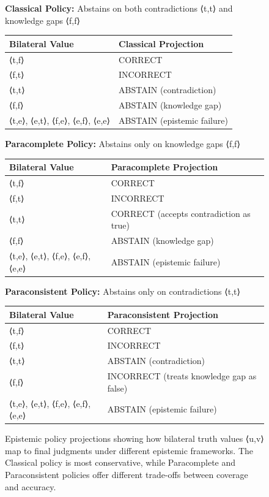 \documentclass[11pt]{article}
\begin{document}
\begin{figure}[htbp]
\centering
\begin{tcolorbox}[colback=white,colframe=promptborder,title={Epistemic Policy Projections from Bilateral Truth Values}]
\small
\textbf{Classical Policy:} Abstains on both contradictions ⟨t,t⟩ and knowledge gaps ⟨f,f⟩\\[0.5em]
\begin{tabular}{l|l}
\hline
Bilateral Value & Classical Projection \\
\hline
⟨t,f⟩ & CORRECT \\
⟨f,t⟩ & INCORRECT \\
⟨t,t⟩ & ABSTAIN (contradiction) \\
⟨f,f⟩ & ABSTAIN (knowledge gap) \\
⟨t,e⟩, ⟨e,t⟩, ⟨f,e⟩, ⟨e,f⟩, ⟨e,e⟩ & ABSTAIN (epistemic failure) \\
\hline
\end{tabular}

\vspace{1em}
\textbf{Paracomplete Policy:} Abstains only on knowledge gaps ⟨f,f⟩\\[0.5em]
\begin{tabular}{l|l}
\hline
Bilateral Value & Paracomplete Projection \\
\hline
⟨t,f⟩ & CORRECT \\
⟨f,t⟩ & INCORRECT \\
⟨t,t⟩ & CORRECT (accepts contradiction as true) \\
⟨f,f⟩ & ABSTAIN (knowledge gap) \\
⟨t,e⟩, ⟨e,t⟩, ⟨f,e⟩, ⟨e,f⟩, ⟨e,e⟩ & ABSTAIN (epistemic failure) \\
\hline
\end{tabular}

\vspace{1em}
\textbf{Paraconsistent Policy:} Abstains only on contradictions ⟨t,t⟩\\[0.5em]
\begin{tabular}{l|l}
\hline
Bilateral Value & Paraconsistent Projection \\
\hline
⟨t,f⟩ & CORRECT \\
⟨f,t⟩ & INCORRECT \\
⟨t,t⟩ & ABSTAIN (contradiction) \\
⟨f,f⟩ & INCORRECT (treats knowledge gap as false) \\
⟨t,e⟩, ⟨e,t⟩, ⟨f,e⟩, ⟨e,f⟩, ⟨e,e⟩ & ABSTAIN (epistemic failure) \\
\hline
\end{tabular}
\end{tcolorbox}
\caption{Epistemic policy projections showing how bilateral truth values ⟨u,v⟩ map to final judgments under different epistemic frameworks. The Classical policy is most conservative, while Paracomplete and Paraconsistent policies offer different trade-offs between coverage and accuracy.}
\label{fig:epistemic-policies}
\end{figure}
\end{document}
